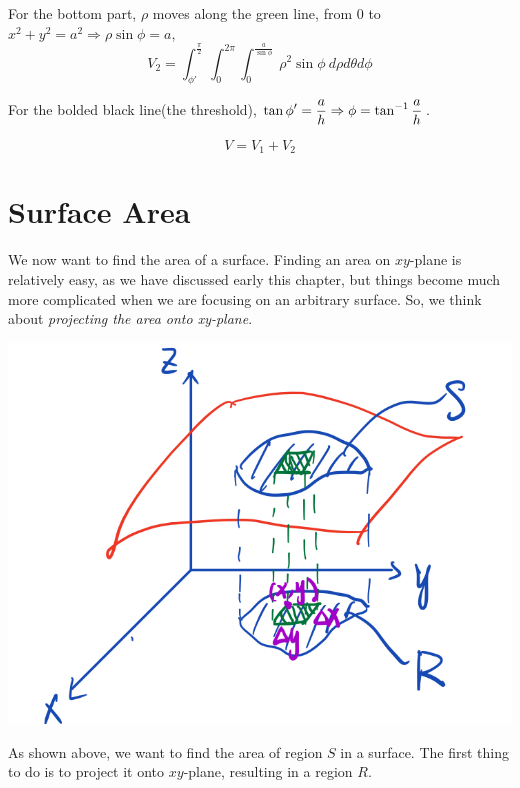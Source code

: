 \documentclass[11pt, a4paper]{MATH2023}
\begin{document}
\begin{spacing}{1.3}
    For the bottom part, $\rho$ moves along the green line, from 0 to $x^2+y^2=a^2\Rightarrow \rho\sin\phi=a$,
    $$V_2=\int_{\phi'}^{\frac{\pi}{2}} \int_0^{2\pi} \int_0^{\frac{a}{\sin\phi}}\ \rho^2\sin\phi\ d\rho d\theta d\phi$$


    For the bolded black line(the threshold), $\displaystyle \tan\phi'=\frac{a}{h}\Rightarrow \phi=\tan^{-1}\frac{a}{h}$.

    $$V=V_1+V_2$$




    

    


    \newpage
    \section{Surface Area}
    
    We now want to find the area of a surface. Finding an area on $xy$-plane is relatively easy, as we 
    have discussed early this chapter, but things become much more complicated when we are focusing
    on an arbitrary surface. So, we think about {\it projecting the area onto xy-plane}.

    \begin{center}
        \includegraphics[scale=0.24]{images/Ch14-surface-area.jpeg}
    \end{center}

    As shown above, we want to find the area of region $S$ in a surface. The first thing to do 
    is to project it onto $xy$-plane, resulting in a region $R$.


\end{spacing}
\end{document}
